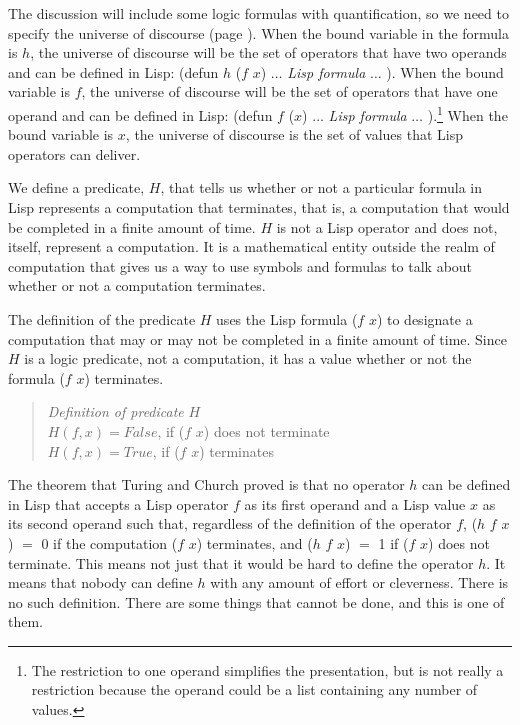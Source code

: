 The discussion will include some logic formulas with
quantification,
so we need to specify the universe of discourse
(page \pageref{def-universe-of-discourse}).
When the bound variable
in the formula is $h$, the universe of discourse
will be the set of operators that have
two operands and can be defined in Lisp:
\textsf{(defun $h$ ($f$ $x$)} $\dots$ \emph{Lisp formula} $\dots$ \textsf{)}.
When the bound variable is $f$,
the universe of discourse will be the set of operators
that have one operand and can be defined in Lisp:
\textsf{(defun $f$ ($x$)} $\dots$ \emph{Lisp formula} $\dots$ \textsf{)}.\footnote{The
restriction to one operand simplifies the presentation,
but is not really a restriction because the operand could
be a list containing any number of values.}
When the bound variable is $x$, the universe of discourse
is the set of values that Lisp operators can deliver.

We define a predicate, $H$, that tells us whether or not
a particular formula in Lisp represents a computation that terminates,
that is, a computation that would be completed in a finite amount of time.
$H$ is not a Lisp operator and does not, itself,
represent a computation. It is a mathematical entity
outside the realm of computation that gives us a way
to use symbols and formulas to talk about
whether or not a computation terminates.

The definition of the predicate $H$ uses the Lisp
formula \textsf{($f$ $x$)} to designate a computation that may
or may not be completed in a finite amount of time.
Since $H$ is a logic predicate, not a computation,
it has a value whether or not the formula \textsf{($f$ $x$)} terminates.
\begin{quote}
\label{def:predicate-H}
\emph{Definition of predicate} $H$\\
\hspace*{3mm}$H(f, x) = False$, if \textsf{($f$ $x$)} does not terminate\\
\hspace*{3mm}$H(f, x) = True$, if \textsf{($f$ $x$)} terminates
\end{quote}

The theorem that Turing and Church proved is that
no operator $h$ can be defined in Lisp
that accepts a Lisp operator $f$ as its
first operand and a Lisp value $x$ as its second operand
such that, regardless of the definition of the operator $f$,
\textsf{($h$ $f$ $x$)} $=$ 0 if the computation \textsf{($f$ $x$)} terminates, and
\textsf{($h$ $f$ $x$)} $=$ 1 if \textsf{($f$ $x$)} does not terminate.
This means not just that it would be hard to define the operator $h$.
It means that nobody can define $h$ with any amount of effort or cleverness.
There is no such definition.
There are some things that cannot be done, and this is one of them.


